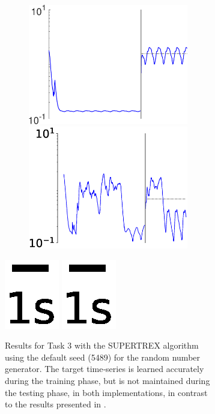 \begin{figure}
\begin{subfigure}{\textwidth}
\begin{subfigure}{\textwidth}
        \hspace{-1.9em}
        \includegraphics[height=0.2\linewidth,width=.45\linewidth]{Figures/Fig_T4/MATLAB/ST_T3_MSE.eps}
        \hspace{.75em}
        \includegraphics[height=0.2\linewidth,width=.45\linewidth]{Figures/Fig_T4/Python/ST_T3_MSE.eps}
        
        \end{subfigure}
        
        
        
        \includegraphics[trim=2cm 6cm 2cm 6cm, clip=true,height=0.05\linewidth,width=.4\linewidth]{Figures/Fig_T1/Python/ST_T1_Scale.eps}
        \includegraphics[trim=2cm 4cm 2cm 6cm, clip=true,height=0.05\linewidth,width=.45\linewidth]{Figures/Fig_T1/Python/ST_T1_Scale.eps}
        

    \caption{Results for Task 3 with the SUPERTREX algorithm using the default seed (5489) for the random number generator. The target time‐series is learned accurately during the training phase, but is not maintained during the testing phase, in both implementations, in contrast to the results presented in \cite{pyle2019}.}
    \label{Fig:compTask3ST}
    
    \end{subfigure}
    
    \begin{subfigure}{\textwidth}
        \centering
        
        \textbf{}\begin{subfigure}{\textwidth}
        \centering
        

\end{subfigure}
\end{subfigure}
\end{figure}
